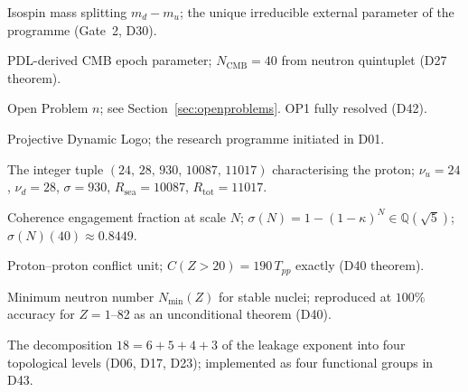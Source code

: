 \documentclass[11pt,a4paper]{article}
\theoremstyle{plain}
\theoremstyle{definition}
\theoremstyle{remark}
\newcommand{\quintuplet}{(24,\,28,\,930,\,10087,\,11017)}
\newcommand{\sigmaN}{\sigma(N)}
\newcommand{\Tpp}{T_{pp}}
\begin{document}
\begin{description}[leftmargin=3.5cm, style=nextline]
\item[$m_{\mathrm{iso}}$] Isospin mass splitting $m_d-m_u$; the unique irreducible external parameter of the programme (Gate~2, D30).
\item[$N_{\mathrm{CMB}}$] PDL-derived CMB epoch parameter; $N_{\mathrm{CMB}}=40$ from neutron quintuplet (D27 theorem).
\item[OP$n$] Open Problem $n$; see Section~\ref{sec:openproblems}. OP1 fully resolved (D42).
\item[PDL] Projective Dynamic Logo; the research programme initiated in D01.
\item[Quintuplet] The integer tuple $\quintuplet$ characterising the proton; $\nu_u=24$, $\nu_d=28$, $\sigma=930$, $R_{\mathrm{sea}}=10087$, $R_{\mathrm{tot}}=11017$.
\item[$\sigmaN(N)$] Coherence engagement fraction at scale $N$; $\sigmaN=1-(1-\kappa)^N\in\mathbb{Q}(\sqrt{5})$; $\sigmaN(40)\approx 0.8449$.
\item[$\Tpp$] Proton--proton conflict unit; $C(Z>20)=190\,\Tpp$ exactly (D40 theorem).
\item[Valley of stability] Minimum neutron number $N_{\min}(Z)$ for stable nuclei; reproduced at $100\%$ accuracy for $Z=1$--82 as an unconditional theorem (D40).
\item[18-filter hierarchy] The decomposition $18=6+5+4+3$ of the leakage exponent into four topological levels (D06, D17, D23); implemented as four functional groups in D43.
\end{description}



\end{document}
